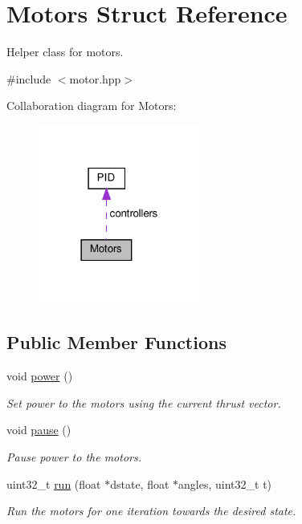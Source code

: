 \hypertarget{structMotors}{}\section{Motors Struct Reference}
\label{structMotors}


Helper class for motors.  




{\ttfamily \#include $<$motor.\+hpp$>$}



Collaboration diagram for Motors\+:\nopagebreak
\begin{figure}[H]
\begin{center}
\leavevmode
\includegraphics[width=153pt]{structMotors__coll__graph}
\end{center}
\end{figure}
\subsection*{Public Member Functions}
\begin{DoxyCompactItemize}
\item 
\mbox{\label{structMotors_ac6532a754e5f1743ee4975b6722b4054}} 
void \hyperlink{structMotors_ac6532a754e5f1743ee4975b6722b4054}{power} ()
\begin{DoxyCompactList}\small\item\em Set power to the motors using the current thrust vector. \end{DoxyCompactList}\item 
\mbox{\label{structMotors_a179c6a24115935994a13493f74f56df8}} 
void \hyperlink{structMotors_a179c6a24115935994a13493f74f56df8}{pause} ()
\begin{DoxyCompactList}\small\item\em Pause power to the motors. \end{DoxyCompactList}\item 
uint32\+\_\+t \hyperlink{structMotors_a0d3909ec9fadbb3028368e7340a2e707}{run} (float $\ast$dstate, float $\ast$angles, uint32\+\_\+t t)
\begin{DoxyCompactList}\small\item\em Run the motors for one iteration towards the desired state. \end{DoxyCompactList}\end{DoxyCompactItemize}
